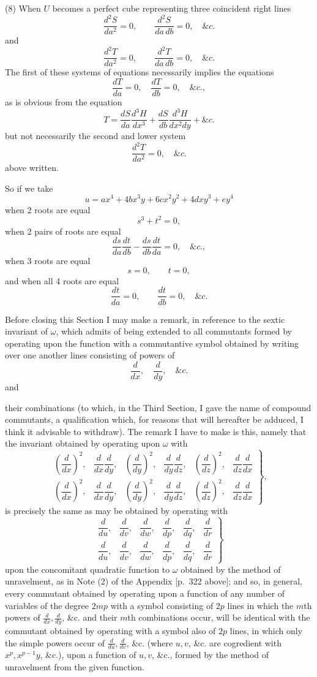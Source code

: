 \documentclass[11pt]{article}
\newcommand{\sourcepage}[1]{\marginpar{\scriptsize p.~#1}}
\begin{document}
{{(8) When $U$ becomes a perfect cube representing three coincident right lines
\[
\frac{d^2S}{da^2}=0,\qquad \frac{d^2S}{da\,db}=0,\quad \&c.
\]
and
\[
\frac{d^2T}{da^2}=0,\qquad \frac{d^2T}{da\,db}=0,\quad \&c.
\]
The first of these systems of equations necessarily implies the equations
\[
\frac{dT}{da}=0,\quad \frac{dT}{db}=0,\quad \&c.,
\]
as is obvious from the equation
\[
T=\frac{dS}{da}\frac{d^3H}{dx^3}
+\frac{dS}{db}\frac{d^3H}{dx^2dy}+\&c.
\]
but not necessarily the second and lower system
\[
\frac{d^2T}{da^2}=0,\quad \&c.
\]
above written.

So if we take
\[
u=ax^4+4bx^3y+6cx^2y^2+4dxy^3+ey^4
\]
when 2 roots are equal
\[
s^3+t^2=0,
\]
when 2 pairs of roots are equal
\[
\frac{ds}{da}\frac{dt}{db}-\frac{ds}{db}\frac{dt}{da}=0,\quad \&c.,
\]
when 3 roots are equal
\[
s=0,\qquad t=0,
\]
and when all 4 roots are equal
\[
\frac{dt}{da}=0,\qquad \frac{dt}{db}=0,\quad \&c.
\]

Before closing this Section I may make a remark, in reference to the sextic invariant of $\omega$, which admits of being extended to all commutants formed by operating upon the function with a commutantive symbol obtained by writing over one another lines consisting of powers of
\[
\frac{d}{dx},\quad \frac{d}{dy},\quad \&c.
\]
and

\sourcepage{337}
their combinations (to which, in the Third Section, I gave the name of compound commutants, a qualification which, for reasons that will hereafter be adduced, I think it advisable to withdraw). The remark I have to make is this, namely that the invariant obtained by operating upon $\omega$ with
\[
\left.
\begin{matrix}
\left(\dfrac{d}{dx}\right)^2,&\dfrac{d}{dx}\dfrac{d}{dy},&
\left(\dfrac{d}{dy}\right)^2,&\dfrac{d}{dy}\dfrac{d}{dz},&
\left(\dfrac{d}{dz}\right)^2,&\dfrac{d}{dz}\dfrac{d}{dx}\\
\left(\dfrac{d}{dx}\right)^2,&\dfrac{d}{dx}\dfrac{d}{dy},&
\left(\dfrac{d}{dy}\right)^2,&\dfrac{d}{dy}\dfrac{d}{dz},&
\left(\dfrac{d}{dz}\right)^2,&\dfrac{d}{dz}\dfrac{d}{dx}
\end{matrix}
\right\},
\]
is precisely the same as may be obtained by operating with
\[
\left.
\begin{matrix}
\dfrac{d}{du},&\dfrac{d}{dv},&\dfrac{d}{dw},&
\dfrac{d}{dp},&\dfrac{d}{dq},&\dfrac{d}{dr}\\
\dfrac{d}{du},&\dfrac{d}{dv},&\dfrac{d}{dw},&
\dfrac{d}{dp},&\dfrac{d}{dq},&\dfrac{d}{dr}
\end{matrix}
\right\}
\]
upon the concomitant quadratic function to $\omega$ obtained by the method of unravelment, as in Note (2) of the Appendix [p.~322 above]; and so, in general, every commutant obtained by operating upon a function of any number of variables of the degree $2mp$ with a symbol consisting of $2p$ lines in which the $m$th powers of $\frac{d}{dx},\frac{d}{dy}$, \&c. and their $m$th combinations occur, will be identical with the commutant obtained by operating with a symbol also of $2p$ lines, in which only the simple powers occur of $\frac{d}{du},\frac{d}{dv}$, \&c. (where $u,v$, \&c. are cogredient with $x^p,x^{p-1}y$, \&c.), upon a function of $u,v$, \&c., formed by the method of unravelment from the given function.

}}
\end{document}
